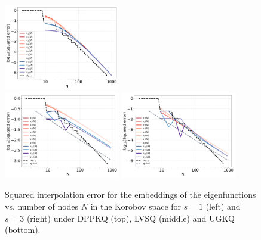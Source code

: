 \documentclass[twoside,11pt]{book}
\numberwithin{theorem}{chapter}
\numberwithin{definition}{chapter}
\numberwithin{proposition}{chapter}
\numberwithin{corollary}{chapter}
\numberwithin{example}{chapter}
\numberwithin{lemma}{chapter}
\numberwithin{assumption}{chapter}
\numberwithin{equation}{chapter}
\numberwithin{figure}{chapter}
\begin{document}
\begin{figure}
\includegraphics[width=0.45\textwidth]{img/neurips/multiSobolev/LVSQ_multig_interpolation_Korobov_s_2_fig_1.pdf}\\
\includegraphics[width=0.45\textwidth]{img/neurips/multiSobolev/UGKQ_multig_interpolation_Korobov_s_1_fig_1.pdf}
\includegraphics[width=0.45\textwidth]{img/neurips/multiSobolev/UGKQ_multig_interpolation_Korobov_s_2_fig_1.pdf}\\
\caption{Squared interpolation error for the embeddings of the eigenfunctions vs. number of nodes $N$ in the Korobov space for $s = 1$ (left) and $s=3$ (right) under DPPKQ (top), LVSQ (middle) and UGKQ (bottom).
\label{fig:Korobov_multig_results}}
\end{figure} 

\end{document}
